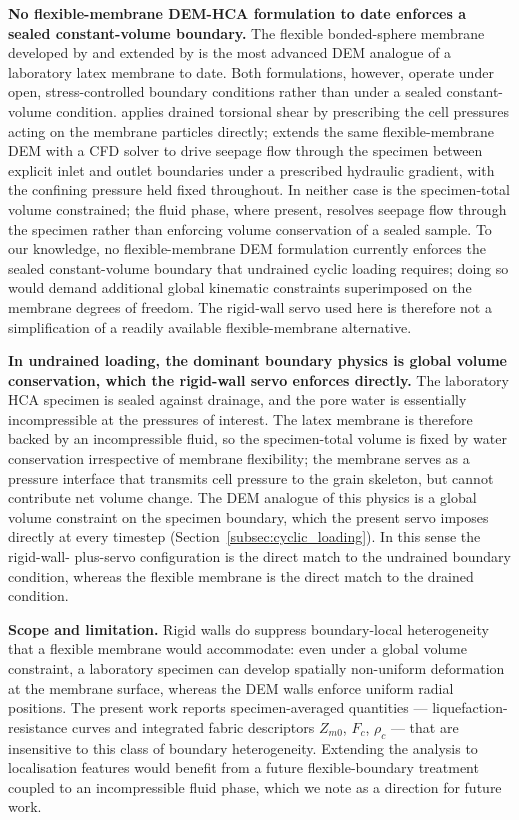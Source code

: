 \documentclass[11pt,a4paper]{article}
\begin{document}
\medskip
\noindent\textbf{No flexible-membrane DEM-HCA formulation to date
enforces a sealed constant-volume boundary.}
The flexible bonded-sphere membrane developed by \citet{Song2024} and
extended by \citet{Song2024suffusion} is the most advanced DEM
analogue of a laboratory latex membrane to date. Both formulations,
however, operate under open, stress-controlled boundary conditions
rather than under a sealed constant-volume condition. \citet{Song2024}
applies drained torsional shear by prescribing the cell pressures
acting on the membrane particles directly; \citet{Song2024suffusion}
extends the same flexible-membrane DEM with a CFD solver to drive
seepage flow through the specimen between explicit inlet and outlet
boundaries under a prescribed hydraulic gradient, with the confining
pressure held fixed throughout. In neither case is the specimen-total
volume constrained; the fluid phase, where present, resolves seepage
flow through the specimen rather than enforcing volume conservation
of a sealed sample. To our knowledge, no flexible-membrane DEM
formulation currently enforces the sealed constant-volume boundary
that undrained cyclic loading requires; doing so would demand
additional global kinematic constraints superimposed on the membrane
degrees of freedom. The rigid-wall servo used here is therefore not a
simplification of a readily available flexible-membrane alternative.

\medskip
\noindent\textbf{In undrained loading, the dominant boundary physics
is global volume conservation, which the rigid-wall servo enforces
directly.}
The laboratory HCA specimen is sealed against drainage, and the pore
water is essentially incompressible at the pressures of interest. The
latex membrane is therefore backed by an incompressible fluid, so the
specimen-total volume is fixed by water conservation irrespective of
membrane flexibility; the membrane serves as a pressure interface
that transmits cell pressure to the grain skeleton, but cannot
contribute net volume change. The DEM analogue of this physics is a
global volume constraint on the specimen boundary, which the present
servo imposes directly at every timestep
(Section~\ref{subsec:cyclic_loading}). In this sense the rigid-wall-
plus-servo configuration is the direct match to the undrained
boundary condition, whereas the flexible membrane is the direct
match to the drained condition.

\medskip
\noindent\textbf{Scope and limitation.}
Rigid walls do suppress boundary-local heterogeneity that a flexible
membrane would accommodate: even under a global volume constraint, a
laboratory specimen can develop spatially non-uniform deformation at
the membrane surface, whereas the DEM walls enforce uniform radial
positions. The present work reports specimen-averaged quantities ---
liquefaction-resistance curves and integrated fabric descriptors
$Z_{m0}$, $F_c$, $\rho_c$ --- that are insensitive to this class of
boundary heterogeneity. Extending the analysis to localisation
features would benefit from a future flexible-boundary treatment
coupled to an incompressible fluid phase, which we note as a
direction for future work.
\end{document}

